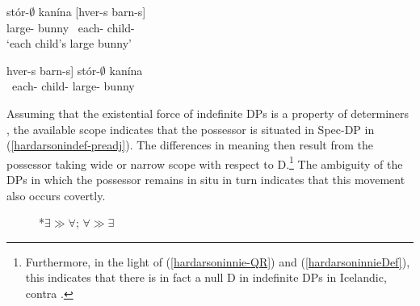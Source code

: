 \documentclass[output=paper,colorlinks,citecolor=brown,
]{langscibook}
\begin{document}
\begin{exe}
\settowidth\jamwidth {*$\exists \gg \forall$; $\forall \gg \exists$}
\ex	\label{hardarsoninnie-QR}
	\begin{xlist}
		\ex	\gll	stór-$\emptyset$ kanína [hver-s barn-s] \label{hardarsonindef-postnom}\\
					large-{\hardStr} bunny	~each-{\hardGen} child-{\hardGen}\\ \jambox{$\exists \gg \forall$; $\forall \gg \exists$}
			\glt	`each child's large bunny'  
	
		\ex	\gll	{[}hver-s barn-s] stór-$\emptyset$ kanína \label{hardarsonindef-preadj}\\
					~each-{\hardGen} child-{\hardGen} large-{\hardStr} bunny\\ \jambox{*$\exists \gg \forall$; $\forall \gg \exists$}
			\glt 	
	\end{xlist}
\end{exe}

\noindent Assuming that the existential force of indefinite DPs is a property of determiners  \citep[cf.][]{chierchia1992}, the available scope indicates that the possessor is situated in Spec-DP in (\ref{hardarsonindef-preadj}). The differences in meaning then result from the possessor taking wide or narrow scope with respect to D.\footnote{Furthermore, in the light of (\ref{hardarsoninnie-QR}) and (\ref{hardarsoninnieDef}), this indicates that there is in fact a null D in indefinite DPs in Icelandic, contra \citet{Hardarson:2016wd}.} The ambiguity of the DPs in which the possessor remains in situ in turn indicates that this movement also occurs covertly.

\begin{figure}
\begin{floatrow}
        {\caption{$\exists \gg \forall$; $\forall \gg \exists$}}
        {\caption{*$\exists \gg \forall$; $\forall \gg \exists$}}
\end{floatrow}
\end{figure}
\end{document}

